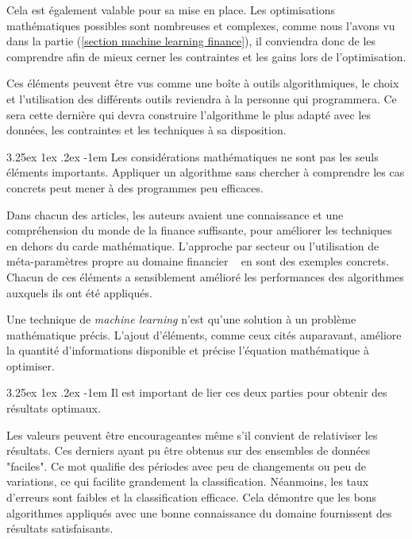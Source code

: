 \documentclass[a4paper, 11pt]{article}
\makeatletter
\renewcommand\paragraph{\@startsection{paragraph}{5}{\z@}%
  {3.25ex \@plus1ex \@minus.2ex}%
  {-1em}%
  {\normalfont\normalsize\bfseries}}
\makeatother
\begin{document}
Cela est également valable pour sa mise en place. Les optimisations mathématiques possibles sont nombreuses et complexes,
comme nous l'avons vu dans la partie (\ref{section machine learning finance}), il conviendra donc de les comprendre afin de
mieux cerner les contraintes et les gains lors de l'optimisation.

Ces éléments peuvent être vus comme une boîte à outils algorithmiques, le choix et l'utilisation des différents
outils reviendra à la personne qui programmera. Ce sera cette dernière qui devra construire l'algorithme le plus
adapté avec les données, les contraintes et les techniques à sa disposition.

\paragraph{}
Les considérations mathématiques ne sont pas les seuls éléments importants. Appliquer un algorithme sans chercher à comprendre
les cas concrets peut mener à des programmes peu efficaces.

Dans chacun des articles, les auteurs avaient une connaissance et une compréhension du monde de la finance suffisante,
pour améliorer les techniques en dehors du carde mathématique. L'approche par secteur \cite{machine_learning_automated_trading}
ou l'utilisation de méta-paramètres propre au domaine financier ~\cite{fx_trading} en sont des exemples concrets.
Chacun de ces éléments a sensiblement amélioré les performances des algorithmes auxquels ils ont été appliqués.

Une technique de \textit{machine learning} n'est qu'une solution à un problème mathématique précis. L'ajout d'éléments,
comme ceux cités auparavant, améliore la quantité d'informations disponible et précise l'équation mathématique à optimiser.

\paragraph{}
Il est important de lier ces deux parties pour obtenir des résultats optimaux.

Les valeurs peuvent être encourageantes même s'il convient de relativiser les résultats. Ces derniers ayant pu
être obtenus sur des ensembles de données "faciles". Ce mot qualifie des périodes avec peu de changements ou peu de
variations, ce qui facilite grandement la classification.
Néanmoins, les taux d'erreurs sont faibles et la classification efficace.
Cela démontre que les bons algorithmes appliqués avec une bonne connaissance du domaine fournissent des résultats satisfaisants. 
\end{document}
